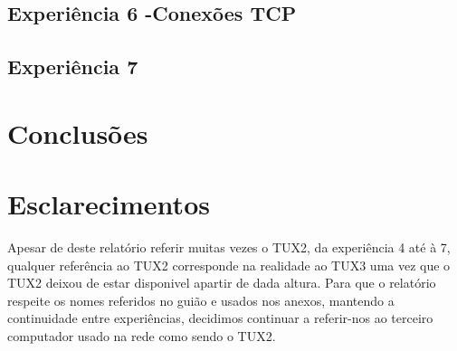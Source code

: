 \documentclass[11pt,a4paper,reqno]{report}
\numberwithin{equation}{section}
\begin{document}
\section{Experiência 6 -Conexões TCP}

\section{Experiência 7 }

\chapter{Conclusões}

\chapter{Esclarecimentos}

Apesar de deste relatório referir muitas vezes o TUX2, da experiência 4 até à 7, qualquer referência ao TUX2 corresponde na realidade ao TUX3 uma vez que o TUX2 deixou de estar disponivel apartir de dada altura. Para que o relatório respeite os nomes referidos no guião e usados nos anexos, mantendo a continuidade entre experiências, decidimos continuar a referir-nos ao terceiro computador usado na rede como sendo o TUX2.  

\end{document}
